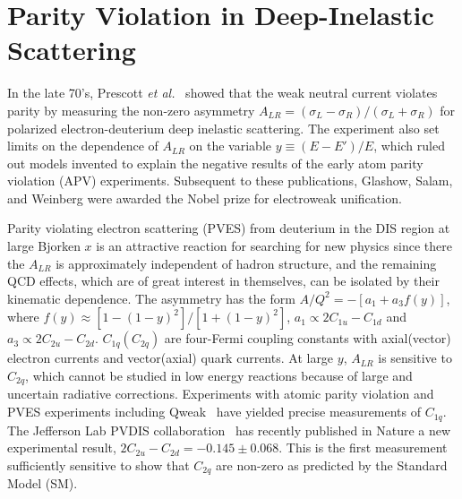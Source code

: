 \documentclass[12pt]{article}
\begin{document}



\section{Parity Violation in Deep-Inelastic Scattering}
In the late 70's, Prescott {\it et al.}~\cite{Prescott:1978tm, Prescott:1979dh} showed that the weak neutral current violates parity by measuring the non-zero asymmetry 
$A_{LR}=(\sigma_L-\sigma_R)/(\sigma_L+\sigma_R)$ for polarized electron-deuterium deep inelastic scattering.  The experiment also set limits on the dependence of $A_{LR}$  on the variable $y\equiv (E-E')/E$, which ruled out models invented to explain the negative results of the early atom parity violation (APV) experiments.  Subsequent to these publications, Glashow, Salam, and Weinberg were awarded the Nobel prize for electroweak unification.

Parity violating electron scattering (PVES) from deuterium in the DIS region at large Bjorken $x$ is an attractive reaction for searching for new physics since there the $A_{LR}$ is approximately independent of hadron structure, and the remaining QCD effects, which are of great interest in themselves, can be isolated by their kinematic dependence.  The asymmetry has the form $A/Q^2=-[a_1+a_3f(y)]$, where $f(y)\approx[1-(1-y)^2]/[1+(1-y)^2]$, $a_1\propto 2 C_{1u}-C_{1d}$ and $a_3\propto 2 C_{2u}-C_{2d}$. $C_{1q}(C_{2q})$ are four-Fermi coupling constants with axial(vector) electron currents and vector(axial) quark currents.  At large $y$, $A_{LR}$ is sensitive to $C_{2q}$, which cannot be studied in low energy reactions because of large and uncertain radiative corrections.
Experiments with atomic parity violation and PVES experiments including 
Qweak~\cite{Androic:2013rhu} have yielded precise measurements of $C_{1q}$.  The Jefferson Lab PVDIS collaboration~\cite{Wang:2014bba} has recently published in Nature a new experimental result,   
$2C_{2u}-C_{2d}=-0.145\pm0.068$. This is the first measurement sufficiently sensitive to show that $C_{2q}$ are non-zero as predicted by the Standard Model (SM).
\end{document}

